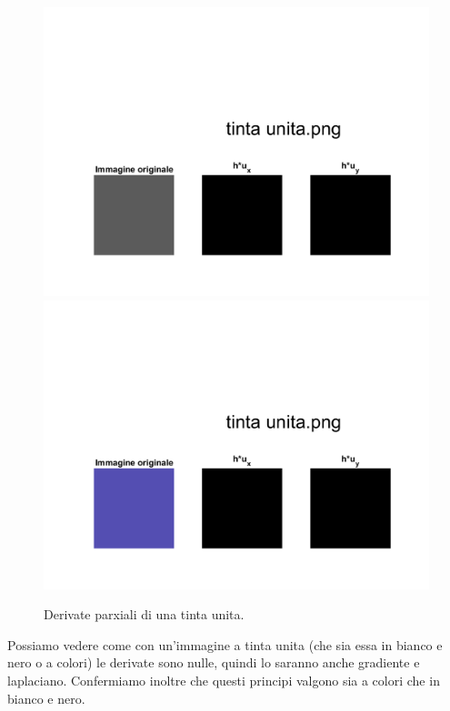 \begin{figure}[htb] 
\centering
\includegraphics[scale=0.4, trim = 0 0 0 10.5cm, clip]{Pictures/Risultati/tinta unita bianco e nero derivate parziali.png}
\includegraphics[scale=0.4, trim = 0 0 0 10.5cm, clip]{Pictures/Risultati/tinta unita derivate parziali.png}
\caption{Derivate parxiali di una tinta unita.}\label{fig:figura}
\end{figure}

Possiamo vedere come con un'immagine a tinta unita (che sia essa in bianco e nero o a colori) le derivate sono nulle, quindi lo saranno anche gradiente e laplaciano. Confermiamo inoltre che questi principi valgono sia a colori che in bianco e nero.\\

